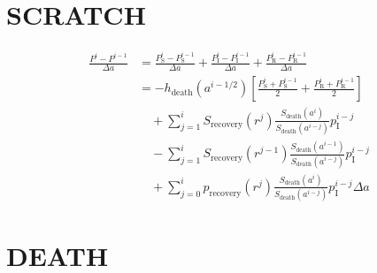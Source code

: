 \documentclass[12pt]{article}
\begin{document}
\section{SCRATCH}

\begin{equation}
  \begin{split}
    \frac{P^i - P^{i - 1}}{\Delta a}
    &=
    \frac{P_{\mathrm{S}}^i - P_{\mathrm{S}}^{i - 1}}{\Delta a}
    +
    \frac{P_{\mathrm{I}}^i - P_{\mathrm{I}}^{i - 1}}{\Delta a}
    +
    \frac{P_{\mathrm{R}}^i - P_{\mathrm{R}}^{i - 1}}{\Delta a}
    \\
    &=
    - h_{\text{death}}(a^{i - 1 / 2})
    \left[
      \frac{P_{\mathrm{S}}^i + P_{\mathrm{S}}^{i - 1}}{2}
      + \frac{P_{\mathrm{R}}^i + P_{\mathrm{R}}^{i - 1}}{2}
    \right]
    \\ & \quad {}
    + \sum_{j = 1}^i S_{\text{recovery}}(r^j)
    \frac{S_{\text{death}}(a^i)}{S_{\text{death}}(a^{i - j})}
    p_{\mathrm{I}}^{i - j}
    \\ & \quad {}
    - \sum_{j = 1}^i S_{\text{recovery}}(r^{j - 1})
    \frac{S_{\text{death}}(a^{i - 1})}{S_{\text{death}}(a^{i - j})}
    p_{\mathrm{I}}^{i - j}
    \\ & \quad {}
    + \sum_{j = 0}^i  %
    p_{\text{recovery}}(r^j)
    \frac{S_{\text{death}}(a^i)}{S_{\text{death}}(a^{i - j})}
    p_{\mathrm{I}}^{i - j}
    \Delta a
  \end{split}
\end{equation}


\section{DEATH}
\end{document}
